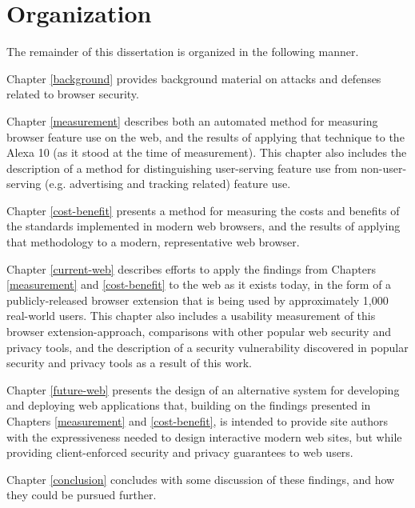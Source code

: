 \section{Organization}
\label{intro:organization}

The remainder of this dissertation is organized in the following manner.

Chapter \ref{background} provides background material on attacks and defenses
related to browser security.

Chapter \ref{measurement} describes both an automated method for measuring
browser feature use on the web, and the results of applying that technique
to the Alexa 10 (as it stood at the time of measurement).  This chapter
also includes the description of a method for distinguishing user-serving
feature use from non-user-serving (e.g. advertising and tracking related)
feature use.

Chapter \ref{cost-benefit} presents a method for measuring the costs and
benefits of the \WAPI standards implemented in modern web browsers, and
the results of applying that methodology to a modern, representative web
browser.

Chapter \ref{current-web} describes efforts to apply the findings from Chapters
\ref{measurement} and \ref{cost-benefit} to the web as it exists today, in the
form of a publicly-released browser extension that is being used by
approximately 1,000 real-world users.  This chapter also includes a usability
measurement of this browser extension-approach, comparisons with other popular
web security and privacy tools, and the description of a security vulnerability
discovered in popular security and privacy tools as a result of this work.

Chapter \ref{future-web} presents the design of an alternative system for developing
and deploying web applications that, building on the findings presented in
Chapters \ref{measurement} and \ref{cost-benefit}, is intended to provide
site authors with the expressiveness needed to design interactive modern web
sites, but while providing client-enforced security and privacy guarantees to
web users.

Chapter \ref{conclusion} concludes with some discussion of these findings, and
how they could be pursued further.
